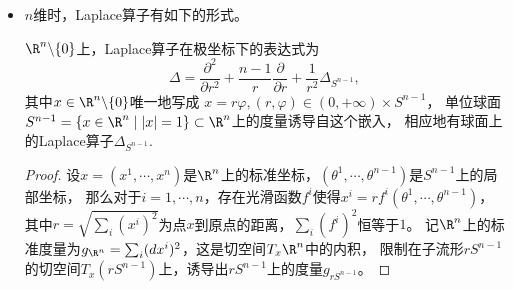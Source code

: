 \begin{itemize}
        \begin{align*}
            \Delta u= *\,d*d u &= *\,d*
            \big(u_r dr+ u_\theta d\theta + u_\varphi d\varphi\big)\\
            &= *\,d(u_r r^2 \sin \theta d\theta \wedge d\varphi 
            - u_\theta \sin \theta dr\wedge d\varphi
            + \frac{u_\varphi}{\sin \theta}dr\wedge d\theta)\\
            &= *\left( \bigg(\frac{\partial}{\partial r}(u_r r^2)\sin \theta 
            +\frac{\partial}{\partial \theta} (u_\theta \sin \theta) 
            + \frac{u_{\varphi \varphi}}{\sin \theta}\bigg)
            dr\wedge d\theta \wedge d\varphi \right)\\
            &=\frac{1}{r^2 \sin \theta}
            \left( \frac{\partial}{\partial r}(u_r r^2)\sin \theta 
            +\frac{\partial}{\partial \theta} (u_\theta \sin \theta) 
            + \frac{u_{\varphi \varphi}}{\sin \theta}\right).
        \end{align*}


\item[注：] $n$维时，Laplace算子有如下的形式。
\begin{formula*}
    $\R^n\backslash\{0\}$上，Laplace算子在极坐标下的表达式为
    $$\Delta=\frac{\partial^2}{\partial r^2}
    +\frac{n-1}{r}\frac{\partial}{\partial r}+\frac{1}{r^2}\Delta_{S^{n-1}},$$
    其中$x\in\R^n\backslash\{0\}$唯一地写成
    $x=r\varphi,(r,\varphi)\in(0,+\infty)\times S^{n-1}$，
    单位球面$S^{n-1}=\{x\in\R^n\mid|x|=1\}\subset\R^n$上的度量诱导自这个嵌入，
    相应地有球面上的Laplace算子$\Delta_{S^{n-1}}$.
\end{formula*}
\begin{proof}
    设$x=(x^1,\cdots,x^n)$是$\R^n$上的标准坐标，$(\theta^1,\cdots,\theta^{n-1})$是$S^{n-1}$上的局部坐标，
    那么对于$i=1,\cdots,n$，存在光滑函数$f^i$使得$x^i=rf^i(\theta^1,\cdots,\theta^{n-1})$，
    其中$r=\sqrt{\sum_i(x^i)^2}$为点$x$到原点的距离，$\sum_i(f^i)^2$恒等于$1$。
    记$\R^n$上的标准度量为$g_{\R^n}=\sum_{i}(dx^i)^2$，这是切空间$T_x\R^n$中的内积，
    限制在子流形$rS^{n-1}$的切空间$T_x(rS^{n-1})$上，诱导出$rS^{n-1}$上的度量$g_{rS^{n-1}}$。
    

\end{proof}
\end{itemize}
